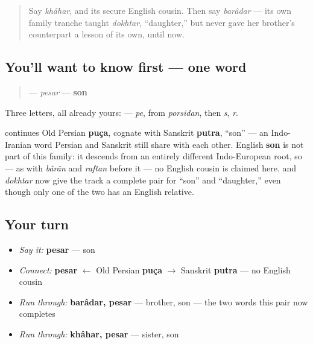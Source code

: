 \label{lesson:FA-C14-pesar}



\begin{quote}
Say \emph{khâhar}, and its secure English cousin. Then say \emph{barâdar} — its own family tranche taught \emph{dokhtar}, \textquotedblleft{}daughter,\textquotedblright{} but never gave her brother's counterpart a lesson of its own, until now.
\end{quote}

\subsection*{You'll want to know first — one word}
\begin{quote}
\textbf{} — \emph{pesar} — \textbf{son}
\end{quote}

Three letters, all already yours: \textbf{  } — \textbf{} \emph{pe}, from \emph{porsidan}, then \emph{s}, \emph{r}.

\begin{cousinweb}
\textbf{} continues Old Persian \textbf{puça}, cognate with Sanskrit \textbf{putra}, \textquotedblleft{}son\textquotedblright{} — an Indo-Iranian word Persian and Sanskrit still share with each other. English \textbf{son} is not part of this family: it descends from an entirely different Indo-European root, so — as with \emph{bârân} and \emph{raftan} before it — no English cousin is claimed here. \textbf{} and \emph{dokhtar} now give the track a complete pair for \textquotedblleft{}son\textquotedblright{} and \textquotedblleft{}daughter,\textquotedblright{} even though only one of the two has an English relative.
\end{cousinweb}

\subsection*{Your turn}
\begin{itemize}
\raggedright
  \item \emph{Say it:} \textbf{pesar} — son
  \item \emph{Connect:} \textbf{pesar} $\leftarrow$ Old Persian \textbf{puça} $\to$ Sanskrit \textbf{putra} — no English cousin
  \item \emph{Run through:} \textbf{barâdar, pesar} — brother, son — the two words this pair now completes
  \item \emph{Run through:} \textbf{khâhar, pesar} — sister, son
\end{itemize}

